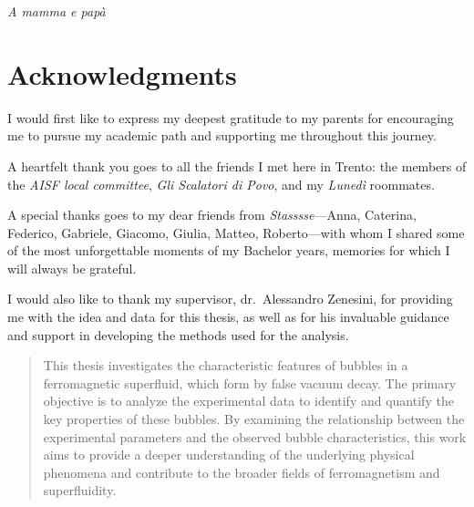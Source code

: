 

\LogoWidth{4.5cm} %

\begin{titlepage}
    \pagestyle{empty}
    \makefrontpage
    \restoregeometry
\end{titlepage}

\thispagestyle{empty} %

\frontmatter
\null{}
\begin{flushright}
    \textit{A mamma e papà}
\end{flushright}
\null

\chapter*{Acknowledgments}
I would first like to express my deepest gratitude to my parents for encouraging me to pursue my academic path and supporting me throughout this journey.

A heartfelt thank you goes to all the friends I met here in Trento: the members of the \textit{AISF local committee}, \textit{Gli Scalatori di Povo}, and my \textit{Lunedì} roommates.

A special thanks goes to my dear friends from \textit{Stasssse}—Anna, Caterina, Federico, Gabriele, Giacomo, Giulia, Matteo, Roberto—with whom I shared some of the most unforgettable moments of my Bachelor years, memories for which I will always be grateful.

I would also like to thank my supervisor, dr.\ Alessandro Zenesini, for providing me with the idea and data for this thesis, as well as for his invaluable guidance and support in developing the methods used for the analysis.

\begin{abstract}
    This thesis investigates the characteristic features of bubbles in a ferromagnetic superfluid, which form by false vacuum decay. The primary objective is to analyze the experimental data to identify and quantify the key properties of these bubbles. By examining the relationship between the experimental parameters and the observed bubble characteristics, this work aims to provide a deeper understanding of the underlying physical phenomena and contribute to the broader fields of ferromagnetism and superfluidity.
\end{abstract}

